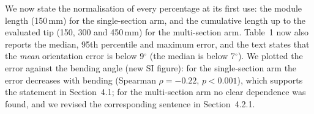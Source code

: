 \documentclass[10pt,a4paper]{article}
\begin{document}
\begin{resp}
We now state the normalisation of every percentage at its first use: the module length (150\,mm) for the single-section arm, and the cumulative length up to the evaluated tip (150, 300 and 450\,mm) for the multi-section arm. Table~1 now also reports the median, 95th percentile and maximum error, and the text states that the \emph{mean} orientation error is below 9$^\circ$ (the median is below 7$^\circ$). We plotted the error against the bending angle (new SI figure): for the single-section arm the error decreases with bending (Spearman $\rho=-0.22$, $p<0.001$), which supports the statement in Section~4.1; for the multi-section arm no clear dependence was found, and we revised the corresponding sentence in Section~4.2.1.
\end{resp}
\end{document}
